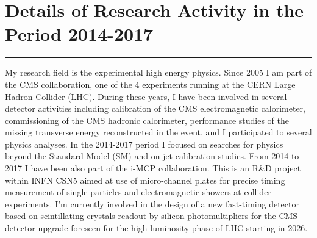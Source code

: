 \documentclass[10pt, a4paper]{article}
\begin{document}
\section*{Details of Research Activity in the Period 2014-2017}
\vspace{-5pt}
\hrule
\vspace{10pt}
My research field is the experimental high energy physics. Since 2005
I am part of the CMS collaboration, one of the 4 experiments running at
the CERN Large Hadron Collider (LHC). During these years, I have been
involved in several detector activities including calibration of the
CMS electromagnetic calorimeter, commissioning of the CMS hadronic
calorimeter, performance studies of the missing transverse energy
reconstructed in the event, and I participated to several physics analyses.
In the 2014-2017 period I focused on searches for physics beyond the
Standard Model (SM) and on jet calibration studies. 
From 2014 to 2017 I have been also part of the i-MCP collaboration. This is
an R\&D project within INFN CSN5 aimed at use of micro-channel plates for
precise timing measurement of single particles and electromagnetic showers
at collider experiments. I'm currently involved in the design of a
new fast-timing detector based on scintillating crystals readout by 
silicon photomultipliers for the CMS detector upgrade foreseen for 
the high-luminosity phase of LHC starting in 2026. \\[1em]
\end{document}
